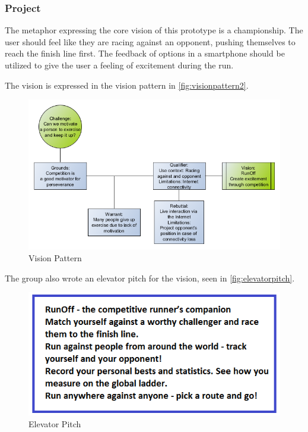 \subsubsection{Project}
The metaphor expressing the core vision of this prototype is a championship. The user should feel like they are racing against an opponent, pushing themselves to reach the finish line first. The feedback of options in a smartphone should be utilized to give the user a feeling of excitement during the run.

The vision is expressed in the vision pattern in \autoref{fig:visionpattern2}.

\begin{figure}[!ht]
	\begin{center}
		\includegraphics[scale=0.5]{img/visionpattern2.png}
		\caption{Vision Pattern}
		\label{fig:visionpattern2}
	\end{center}
\end{figure}

The group also wrote an elevator pitch for the vision, seen in \autoref{fig:elevatorpitch}.

\begin{figure}[!ht]
	\begin{center}
		\includegraphics[scale=0.5]{img/elevatorpitch.png}
		\caption{Elevator Pitch}
		\label{fig:elevatorpitch}
	\end{center}
\end{figure}

